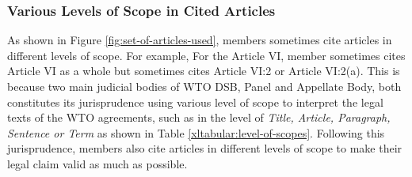\subsubsection{Various Levels of Scope in Cited Articles}
As shown in Figure \ref{fig:set-of-articles-used}, 
members sometimes
cite articles in different levels of scope. For example, 
For the Article VI, member sometimes cites
Article VI as a whole but sometimes cites
Article VI:2 or Article VI:2(a).
This is because two main judicial bodies of WTO DSB, Panel and Appellate Body, 
both constitutes its jurisprudence using
various level of scope to interpret the legal texts of the WTO agreements,
such as in the level of \textit{Title, Article, Paragraph, Sentence or Term} as shown in Table {\ref{xltabular:level-of-scopes}}. 
Following this jurisprudence, members also cite articles in different levels of scope to 
make their legal claim valid as much as possible.

